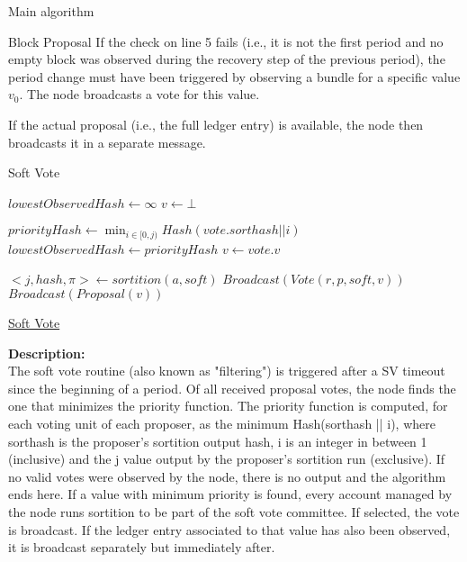 \documentclass[10pt,a4paper]{article}
\begin{document}
\begin{section}{Main algorithm}
\begin{subsection}{Block Proposal}
If the check on line 5 fails (i.e., it is not the first period and no 
empty block was observed during the recovery step of the previous period), 
the period change must have been triggered by observing a bundle for a specific value $v_0$. 
The node broadcasts a vote for this value.

If the actual proposal (i.e., the full ledger entry) is available, the node then broadcasts it 
in a separate message.


\end{subsection}
\begin{subsection}{Soft Vote}\label{ssect:softvote}

\begin{algorithm}[H]
    \begin{algorithmic}[1]
    \State $lowestObservedHash \gets \infty$
    \State $v \gets \bot$ 


        \State $priorityHash \gets \min_{i \in [0, j)} Hash(vote.sorthash || i)$
            \State $lowestObservedHash \gets priorityHash$
            \State $v \gets vote.v$
        \EndIf    
    \EndFor

        \State $<j, hash, \pi> \gets sortition(a, soft)$
            \State $Broadcast(Vote(r, p, soft, v))$
                \State $Broadcast(Proposal(v))$
            \EndIf
        \EndIf
    \EndFor

    \EndFunction
    \end{algorithmic}
    \caption{\underline{Soft Vote}}
\end{algorithm}

\noindent \textbf{Description:}\\
The soft vote routine (also known as "filtering") is triggered after a SV timeout since the beginning of a period.
Of all received proposal votes, the node finds the one that minimizes the priority function.
The priority function is computed, for each voting unit of each proposer, as the minimum Hash(sorthash || i), where sorthash is
the proposer's sortition output hash, i is an integer in between 1 (inclusive) and the j value output by
the proposer's sortition run (exclusive).
If no valid votes were observed by the node, there is no output and the algorithm ends here.
If a value with minimum priority is found, every account managed by the node runs sortition to be part of 
the soft vote committee.
If selected, the vote is broadcast. If the ledger entry associated to that value has also been observed, it is broadcast
separately but immediately after.


\end{subsection}
\end{section}
\end{document}
